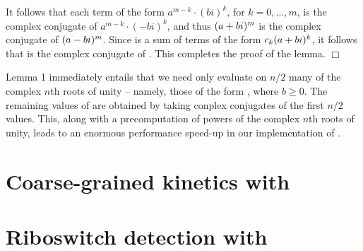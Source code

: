 It follows that each term of the form
$a^{m-k} \cdot (bi)^k$, for $k=0,\dots,m$, is the complex conjugate of
$a^{m-k} \cdot (-bi)^k$, and thus $(a+bi)^m$ is the complex conjugate of
$(a-bi)^m$. Since \emZof{}{\aPbi} is a sum of terms of the form $c_k (a+bi)^k$,
it follows that \emZof{}{\aMbi} is the complex conjugate of \emZof{}{\aPbi}.
This completes the proof of the lemma. \hfill $\Box$

Lemma 1 immediately entails that we need only evaluate \emZ{} on $n/2$
many of the complex $n$th roots of unity -- namely, those of the form
\aPbi, where $b \geq 0$. The remaining values of \emZ{} are obtained by
taking conplex conjugates of the first $n/2$ values. This, along with a
precomputation of powers of the complex $n$th roots of unity, leads to an
enormous performance speed-up in our implementation of \fftbor.

\section{Coarse-grained kinetics with \fftbor}
\label{sec:fftbor:kinetics}

\section{Riboswitch detection with \fftbor}
\label{sec:fftbor:rb}
